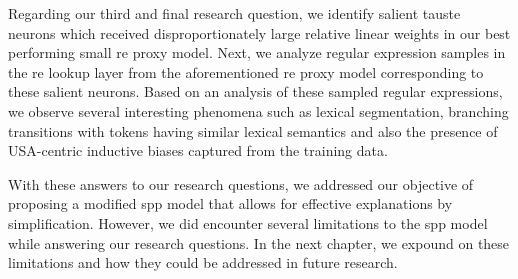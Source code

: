 Regarding our third and final research question, we identify salient \ac{tauste}
neurons which received disproportionately large relative linear weights in our
best performing small \ac{re} proxy model. Next, we analyze regular expression
samples in the \ac{re} lookup layer from the aforementioned \ac{re} proxy model
corresponding to these salient neurons. Based on an analysis of these sampled
regular expressions, we observe several interesting phenomena such as lexical
segmentation, branching transitions with tokens having similar lexical semantics
and also the presence of USA-centric inductive biases captured from the training
data.

\clearpage

With these answers to our research questions, we addressed our objective of
proposing a modified \ac{spp} model that allows for effective
explanations by simplification. However, we did encounter several limitations to
the \ac{spp} model while answering our research questions. In the next
chapter, we expound on these limitations and how they could be addressed in
future research.


